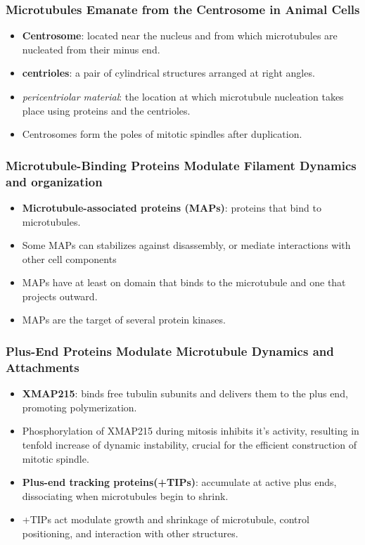 \documentclass[12pt,a4paper]{article}
\begin{document}
\subsubsection{Microtubules Emanate from the Centrosome in Animal Cells}
\begin{itemize}
    \item \textbf{Centrosome}: located near the nucleus and from which microtubules are nucleated from their minus end.
    \item \textbf{centrioles}: a pair of cylindrical structures arranged at right angles. 
    \item \textit{pericentriolar material}: the location at which microtubule nucleation takes place using proteins and the centrioles.
    \item Centrosomes form the poles of mitotic spindles after duplication.
\end{itemize}

\subsubsection{Microtubule-Binding Proteins Modulate Filament Dynamics and organization}
\begin{itemize}
    \item \textbf{Microtubule-associated proteins (MAPs)}: proteins that bind to microtubules. 
    \item Some MAPs can stabilizes against disassembly, or mediate interactions with other cell components
    \item MAPs have at least on domain that binds to the microtubule and one that projects outward.
    \item MAPs are the target of several protein kinases.
\end{itemize}

\subsubsection{Plus-End Proteins Modulate Microtubule Dynamics and Attachments}
\begin{itemize}
    \item \textbf{XMAP215}: binds free tubulin subunits and delivers them to the plus end, promoting polymerization.
    \item Phosphorylation of XMAP215 during mitosis inhibits it's activity, resulting in tenfold increase of dynamic instability, crucial for the efficient construction of mitotic spindle.
    \item \textbf{Plus-end tracking proteins(+TIPs)}: accumulate at active plus ends, dissociating when microtubules begin to shrink.
    \item +TIPs act modulate growth and shrinkage of microtubule, control positioning, and interaction with other structures.
\end{itemize}
\end{document}
